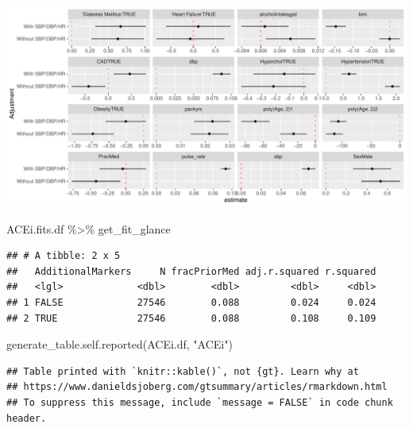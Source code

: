 \documentclass[
]{article}
\newenvironment{Shaded}{\begin{snugshade}}{\end{snugshade}}
\newcommand{\FunctionTok}[1]{\textcolor[rgb]{0.00,0.00,0.00}{#1}}
\newcommand{\NormalTok}[1]{#1}
\newcommand{\SpecialCharTok}[1]{\textcolor[rgb]{0.00,0.00,0.00}{#1}}
\newcommand{\StringTok}[1]{\textcolor[rgb]{0.31,0.60,0.02}{#1}}
\begin{document}
\includegraphics{../results/report_files/figure-latex/ACEi-fit-forest-1.pdf}

\begin{Shaded}
\begin{Highlighting}[]
\NormalTok{ACEi.fits.df }\SpecialCharTok{\%\textgreater{}\%} 
\NormalTok{  get\_fit\_glance}
\end{Highlighting}
\end{Shaded}

\begin{verbatim}
## # A tibble: 2 x 5
##   AdditionalMarkers     N fracPriorMed adj.r.squared r.squared
##   <lgl>             <dbl>        <dbl>         <dbl>     <dbl>
## 1 FALSE             27546        0.088         0.024     0.024
## 2 TRUE              27546        0.088         0.108     0.109
\end{verbatim}

\begin{Shaded}
\begin{Highlighting}[]
\FunctionTok{generate\_table.self.reported}\NormalTok{(ACEi.df, }\StringTok{"ACEi"}\NormalTok{)}
\end{Highlighting}
\end{Shaded}

\begin{verbatim}
## Table printed with `knitr::kable()`, not {gt}. Learn why at
## https://www.danieldsjoberg.com/gtsummary/articles/rmarkdown.html
## To suppress this message, include `message = FALSE` in code chunk header.
\end{verbatim}
\end{document}
